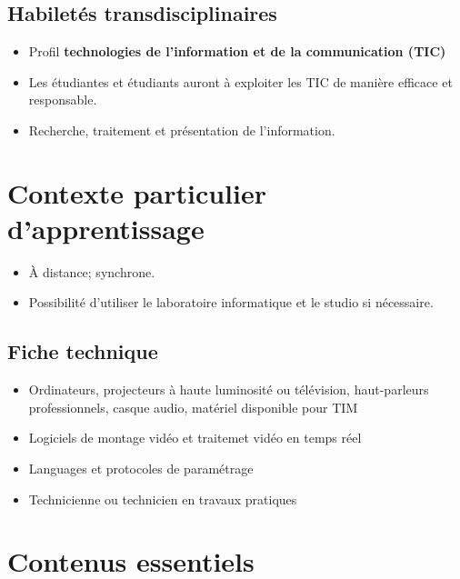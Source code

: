 \documentclass[
  french,
]{book}
\providecommand{\tightlist}{%
  \setlength{\itemsep}{0pt}\setlength{\parskip}{0pt}}
\begin{document}
\hypertarget{habiletuxe9s-transdisciplinaires}{%
\subsection{Habiletés transdisciplinaires}\label{habiletuxe9s-transdisciplinaires}}

\begin{itemize}
\tightlist
\item
  Profil \textbf{technologies de l'information et de la communication (TIC)}
\item
  Les étudiantes et étudiants auront à exploiter les TIC de manière efficace et responsable.
\item
  Recherche, traitement et présentation de l'information.
\end{itemize}

\hypertarget{contexte-particulier-dapprentissage}{%
\section{Contexte particulier d'apprentissage}\label{contexte-particulier-dapprentissage}}

\begin{itemize}
\tightlist
\item
  À distance; synchrone.
\item
  Possibilité d'utiliser le laboratoire informatique et le studio si nécessaire.
\end{itemize}

\hypertarget{fiche-technique}{%
\subsection{Fiche technique}\label{fiche-technique}}

\begin{itemize}
\tightlist
\item
  Ordinateurs, projecteurs à haute luminosité ou télévision, haut-parleurs professionnels, casque audio, matériel disponible pour TIM
\item
  Logiciels de montage vidéo et traitemet vidéo en temps réel
\item
  Languages et protocoles de paramétrage\\
\item
  Technicienne ou technicien en travaux pratiques
\end{itemize}

\hypertarget{contenus_essentiels}{%
\section{Contenus essentiels}\label{contenus_essentiels}}
\end{document}
